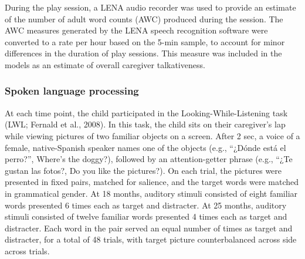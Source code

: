 \documentclass[
  english,
  man,floatsintext]{apa6}
\begin{document}
During the play session, a LENA audio recorder was used to provide an estimate of the number of adult word counts (AWC) produced during the session. The AWC measures generated by the LENA speech recognition software were converted to a rate per hour based on the 5-min sample, to account for minor differences in the duration of play sessions. This measure was included in the models as an estimate of overall caregiver talkativeness.

\hypertarget{spoken-language-processing}{%
\subsubsection{Spoken language processing}\label{spoken-language-processing}}

At each time point, the child participated in the Looking-While-Listening task (LWL; Fernald et al., 2008). In this task, the child sits on their caregiver's lap while viewing pictures of two familiar objects on a screen. After 2 sec, a voice of a female, native-Spanish speaker names one of the objects (e.g., \enquote{¿Dónde está el perro?}, Where's the doggy?), followed by an attention-getter phrase (e.g., ``¿Te gustan las fotos?, Do you like the pictures?). On each trial, the pictures were presented in fixed pairs, matched for salience, and the target words were matched in grammatical gender. At 18 months, auditory stimuli consisted of eight familiar words presented 6 times each as target and distracter. At 25 months, auditory stimuli consisted of twelve familiar words presented 4 times each as target and distracter. Each word in the pair served an equal number of times as target and distracter, for a total of 48 trials, with target picture counterbalanced across side across trials.
\end{document}
